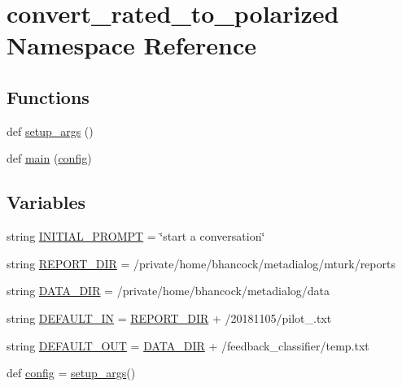 \hypertarget{namespaceconvert__rated__to__polarized}{}\section{convert\+\_\+rated\+\_\+to\+\_\+polarized Namespace Reference}
\label{namespaceconvert__rated__to__polarized}
\subsection*{Functions}
\begin{DoxyCompactItemize}
\item 
def \hyperlink{namespaceconvert__rated__to__polarized_a8bc22c281ecfa0599048982d56f71437}{setup\+\_\+args} ()
\item 
def \hyperlink{namespaceconvert__rated__to__polarized_a3f349162526c4fd1dae393cc9d9ac2fe}{main} (\hyperlink{namespaceconvert__rated__to__polarized_a9f2a838640dc3f5e42dcceb38c328970}{config})
\end{DoxyCompactItemize}
\subsection*{Variables}
\begin{DoxyCompactItemize}
\item 
string \hyperlink{namespaceconvert__rated__to__polarized_a8c23332c776271349b8a466a0207af0c}{I\+N\+I\+T\+I\+A\+L\+\_\+\+P\+R\+O\+M\+PT} = \char`\"{}start a conversation\char`\"{}
\item 
string \hyperlink{namespaceconvert__rated__to__polarized_a85d5365298d76a5b15db51ed006fa301}{R\+E\+P\+O\+R\+T\+\_\+\+D\+IR} = \textquotesingle{}/private/home/bhancock/metadialog/mturk/reports\textquotesingle{}
\item 
string \hyperlink{namespaceconvert__rated__to__polarized_af06b8478fd92517a148a9851d1dd86c3}{D\+A\+T\+A\+\_\+\+D\+IR} = \textquotesingle{}/private/home/bhancock/metadialog/data\textquotesingle{}
\item 
string \hyperlink{namespaceconvert__rated__to__polarized_a351bcec2019cbd74ec749f33d2a17998}{D\+E\+F\+A\+U\+L\+T\+\_\+\+IN} = \hyperlink{namespaceconvert__rated__to__polarized_a85d5365298d76a5b15db51ed006fa301}{R\+E\+P\+O\+R\+T\+\_\+\+D\+IR} + \textquotesingle{}/20181105/pilot\+\_.\+txt\textquotesingle{}
\item 
string \hyperlink{namespaceconvert__rated__to__polarized_adfd1b9b085f15e0d358640d0c3abb1a4}{D\+E\+F\+A\+U\+L\+T\+\_\+\+O\+UT} = \hyperlink{namespaceconvert__rated__to__polarized_af06b8478fd92517a148a9851d1dd86c3}{D\+A\+T\+A\+\_\+\+D\+IR} + \textquotesingle{}/feedback\+\_\+classifier/temp.\+txt\textquotesingle{}
\item 
def \hyperlink{namespaceconvert__rated__to__polarized_a9f2a838640dc3f5e42dcceb38c328970}{config} = \hyperlink{namespaceconvert__rated__to__polarized_a8bc22c281ecfa0599048982d56f71437}{setup\+\_\+args}()
\end{DoxyCompactItemize}


